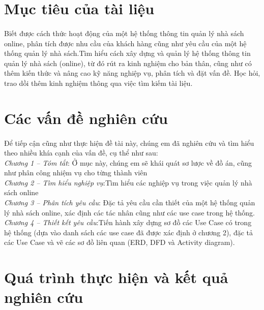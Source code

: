 \documentclass{report}
\newcommand\tab[1][1.25cm]{\hspace*{#1}}
\begin{document}
\fontsize{16}{10}\selectfont  
\section{Mục tiêu của tài liệu}
\fontsize{13}{10}\selectfont
\paragraph{}
    Biết được cách thức hoạt động của một hệ thống thông tin quản lý nhà sách online, phân tích được nhu cầu của khách hàng cũng như yêu cầu của một hệ thống quản lý nhà sách.Tìm hiểu cách xây dựng và quản lý hệ thống thông tin quản lý nhà sách (online), từ đó rút ra kinh nghiệm cho bản thân, cũng như có thêm kiến thức và nâng cao kỹ năng nghiệp vụ, phân tích và đặt vấn đề. Học hỏi, trao dồi thêm kinh nghiệm thông qua việc tìm kiếm tài liệu.
    
\fontsize{16}{10}\selectfont
\section{Các vấn đề nghiên cứu}
\fontsize{13}{10}\selectfont
\paragraph{}
    Để tiếp cận cũng như thực hiện đề tài này, chúng em đã nghiên cứu và tìm hiểu theo nhiều khía cạnh của vấn đề, cụ thể như sau:\\\tab
    \textit{Chương 1 – Tóm tắt}: Ở mục này, chúng em sẽ khái quát sơ lược về đồ án, cũng như phân công nhiệm vụ cho từng thành viên\\\tab
    \textit{Chương 2 – Tìm hiểu nghiệp vụ}:Tìm hiểu các nghiệp vụ trong việc quản lý nhà sách online \\\tab
    \textit{Chương 3 – Phân tích yêu cầu}: Đặc tả yêu cầu cần thiết của một hệ thống quản lý nhà sách online, xác định các tác nhân cũng như các use case trong hệ thống.\\\tab
    \textit{Chương 4 – Thiết kết yêu cầu}:Tiến hành xây dựng sơ đồ các Use Case có trong hệ thống (dựa vào danh sách các use case đã được xác định ở chương 2), đặc tả các Use Case và vẽ các sơ đồ liên quan (ERD, DFD và Activity diagram).\\\tab
    
\fontsize{16}{10}\selectfont
\section{Quá trình thực hiện và kết quả nghiên cứu}
\end{document}
